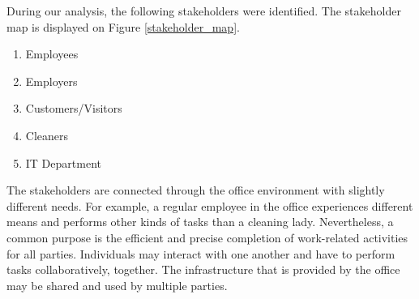 \documentclass[english]{tktltiki}
\begin{document}
During our analysis, the following stakeholders were identified. The stakeholder map is displayed on Figure \ref{stakeholder_map}. 
\begin{enumerate}
	\item Employees
	\item Employers
	\item Customers/Visitors
	\item Cleaners

	\item IT Department

\end{enumerate}

The stakeholders are connected through the office environment with slightly different needs. For example, a regular employee in the office experiences different means and performs other kinds of tasks than a cleaning lady. Nevertheless, a common purpose is the efficient and precise completion of work-related activities for all parties. Individuals may interact with one another and have to perform tasks collaboratively, together. The infrastructure that is provided by the office may be shared and used by multiple parties. 
\end{document}
